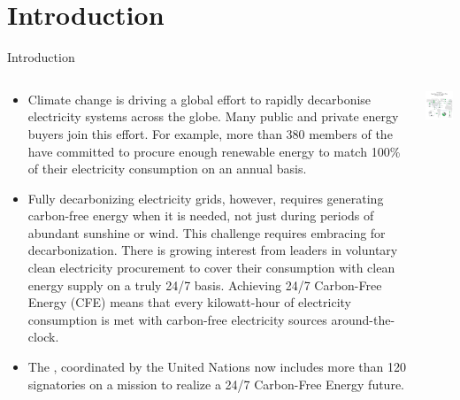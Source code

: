 
\section{Introduction}


\begin{frame}{Introduction}

  {\footnotesize
  \centering
  \begin{columns}[T]
  \begin{column}{9cm}
    \begin{itemize}
    \item Climate change is driving a global effort to \alert{rapidly decarbonise} 
    electricity systems across the globe. Many public and private energy buyers join this effort. For example, more than 380 members of the  have committed to procure enough renewable energy to match 100\% of their electricity consumption on an annual basis.

    \item Fully decarbonizing electricity grids, however, requires generating carbon-free energy when it is needed, not just during periods of abundant sunshine or wind. This challenge requires embracing  for decarbonization. 
    There is growing interest from leaders in voluntary clean  electricity procurement to cover their consumption with clean energy supply on a \alert{truly 24/7 basis}.  Achieving 24/7 Carbon-Free Energy (CFE) means that every kilowatt-hour of electricity consumption is met
    with carbon-free electricity sources around-the-clock.

    \item The , coordinated by the United Nations now includes more than 120 signatories on a mission to realize a 24/7 Carbon-Free Energy future. 

    \end{itemize}
    \end{column}

    \begin{column}{6cm}
    \centering
    \vspace{0.3cm}
    \includegraphics[width=6cm]{images/247-google-web.png}
    \vspace{.1cm}
  \end{column}


\end{columns}}
\end{frame}
